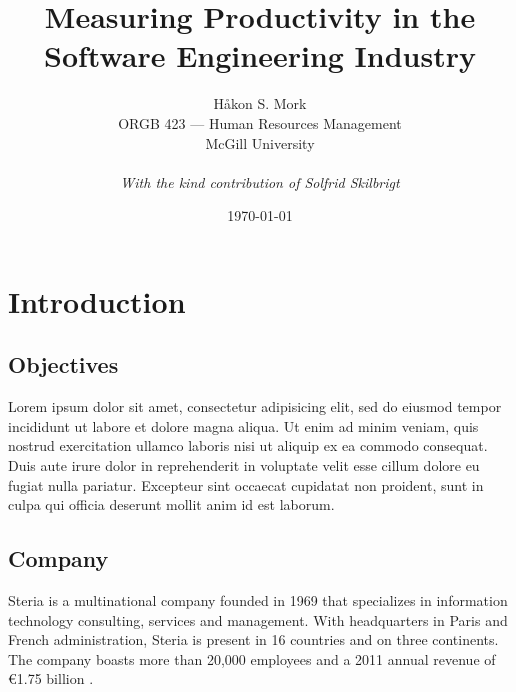 \documentclass[letterpaper, 12pt]{report}
\title{\Huge \textbf{Measuring Productivity in the Software Engineering Industry}}
\author{
	Håkon S. Mork \\ 
	ORGB 423 --- Human Resources Management \\ 
	McGill University \\
	\\
	\emph{With the kind contribution of Solfrid Skilbrigt}
}
\date{\today}
\begin{document}
\maketitle
\tableofcontents

\chapter{Introduction}
\section{Objectives}
Lorem ipsum dolor sit amet, consectetur adipisicing elit, sed do eiusmod tempor incididunt ut labore et dolore magna aliqua. Ut enim ad minim veniam, quis nostrud exercitation ullamco laboris nisi ut aliquip ex ea commodo consequat. Duis aute irure dolor in reprehenderit in voluptate velit esse cillum dolore eu fugiat nulla pariatur. Excepteur sint occaecat cupidatat non proident, sunt in culpa qui officia deserunt mollit anim id est laborum.

\section{Company}
Steria is a multinational company founded in 1969 that specializes in information technology consulting, services and management. 
With headquarters in Paris and French administration, Steria is present in 16 countries and on three continents. 
The company boasts more than 20,000 employees and a 2011 annual revenue of €1.75 billion \parencite{steria:stats}.
\end{document}

